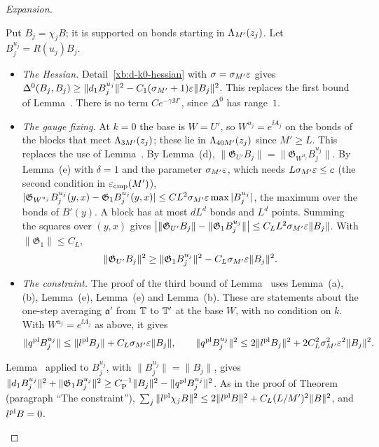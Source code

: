 \begin{proof}[Expansion]
\begin{step}
Put $B_j=\chi_jB$; it is supported on bonds starting in $\Lambda_{M'}(z_j)$. Let $B_j^{u_j}=R(u_j)B_j$.
\begin{itemize}
\item \emph{The Hessian.} Detail~\ref{xb:d-k0-hessian} with $\sigma=\sigma_{M'}\varepsilon$ gives $\Delta^0(B_j,B_j)\ge\|d_1 B_j^{u_j}\|^2-C_1(\sigma_{M'}+1)\varepsilon\|B_j\|^2$. This replaces the first bound of Lemma~. There is no term $Ce^{-\gamma M'}$, since $\Delta^0$ has range~$1$.
\item \emph{The gauge fixing.} At $k=0$ the base is $W=U'$, so $W^{u_j}=e^{\ii A_j}$ on the bonds of the blocks that meet $\Lambda_{3M'}(z_j)$; these lie in $\Lambda_{40M'}(z_j)$ since $M'\ge L$. This replaces the use of Lemma~. By Lemma~(d), $\|\mathfrak G_{U'}B_j\|=\|\mathfrak G_{W^{u_j}}B_j^{u_j}\|$. By Lemma~(e) with $\delta=1$ and the parameter $\sigma_{M'}\varepsilon$, which needs $L\sigma_{M'}\varepsilon\le c$ (the second condition in $\varepsilon_{\rm cmp}(M')$), $|\mathfrak G_{W^{u_j}}B^{u_j}_j(y,x)-\mathfrak G_1B^{u_j}_j(y,x)|\le CL^2\sigma_{M'}\varepsilon\max|B^{u_j}_j|$, the maximum over the bonds of $B'(y)$. A block has at most $dL^d$ bonds and $L^d$ points. Summing the squares over $(y,x)$ gives $\big|\|\mathfrak G_{U'}B_j\|-\|\mathfrak G_1B_j^{u_j}\|\big|\le C_LL^2\sigma_{M'}\varepsilon\|B_j\|$. With $\|\mathfrak G_1\|\le C_L$,
\[
\|\mathfrak G_{U'}B_j\|^2\ge\|\mathfrak G_1B_j^{u_j}\|^2-C_L\sigma_{M'}\varepsilon\|B_j\|^2 .
\]
\item \emph{The constraint.} The proof of the third bound of Lemma~ uses Lemma~(a),(b), Lemma~(e), Lemma~(e) and Lemma~(b). These are statements about the one-step averaging $\mathfrak a'$ from $\mathbb T$ to $\mathbb T'$ at the base $W$, with no condition on $k$. With $W^{u_j}=e^{\ii A_j}$ as above, it gives
\[
\|q^{\rm pl}B_j^{u_j}\|\le\|l^{\rm pl}B_j\|+C_L\sigma_{M'}\varepsilon\|B_j\|,\qquad\|q^{\rm pl}B_j^{u_j}\|^2\le2\|l^{\rm pl}B_j\|^2+2C_L^2\sigma_{M'}^2\varepsilon^2\|B_j\|^2 .
\]
\end{itemize}
\end{step}

\begin{step}
Lemma~ applied to $B_j^{u_j}$, with $\|B_j^{u_j}\|=\|B_j\|$, gives $\|d_1 B_j^{u_j}\|^2+\|\mathfrak G_1B_j^{u_j}\|^2\ge C_{\rm P}^{-1}\|B_j\|^2-\|q^{\rm pl}B_j^{u_j}\|^2$. As in the proof of Theorem~ (paragraph ``The constraint''), $\sum_j\|l^{\rm pl}\chi_jB\|^2\le2\|l^{\rm pl}B\|^2+C_L(L/M')^2\|B\|^2$, and $l^{\rm pl}B=0$.
\end{step}


\end{proof}
